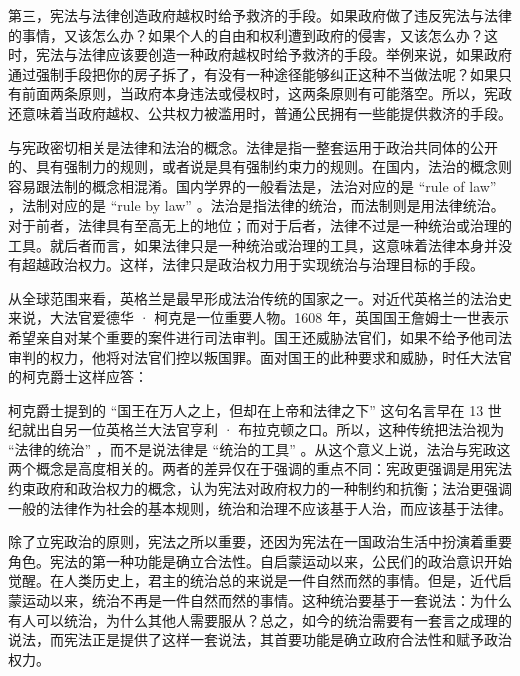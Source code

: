 第三，宪法与法律创造政府越权时给予救济的手段。如果政府做了违反宪法与法律的事情，又该怎么办？如果个人的自由和权利遭到政府的侵害，又该怎么办？这时，宪法与法律应该要创造一种政府越权时给予救济的手段。举例来说，如果政府通过强制手段把你的房子拆了，有没有一种途径能够纠正这种不当做法呢？如果只有前面两条原则，当政府本身违法或侵权时，这两条原则有可能落空。所以，宪政还意味着当政府越权、公共权力被滥用时，普通公民拥有一些能提供救济的手段。

与宪政密切相关是法律和法治的概念。法律是指一整套运用于政治共同体的公开的、具有强制力的规则，或者说是具有强制约束力的规则。在国内，法治的概念则容易跟法制的概念相混淆。国内学界的一般看法是，法治对应的是 “rule of law” ，法制对应的是 “rule by law” 。法治是指法律的统治，而法制则是用法律统治。对于前者，法律具有至高无上的地位；而对于后者，法律不过是一种统治或治理的工具。就后者而言，如果法律只是一种统治或治理的工具，这意味着法律本身并没有超越政治权力。这样，法律只是政治权力用于实现统治与治理目标的手段。

从全球范围来看，英格兰是最早形成法治传统的国家之一。对近代英格兰的法治史来说，大法官爱德华 · 柯克是一位重要人物。1608 年，英国国王詹姆士一世表示希望亲自对某个重要的案件进行司法审判。国王还威胁法官们，如果不给予他司法审判的权力，他将对法官们控以叛国罪。面对国王的此种要求和威胁，时任大法官的柯克爵士这样应答：


柯克爵士提到的 “国王在万人之上，但却在上帝和法律之下” 这句名言早在 13 世纪就出自另一位英格兰大法官亨利 · 布拉克顿之口。所以，这种传统把法治视为 “法律的统治” ，而不是说法律是 “统治的工具” 。从这个意义上说，法治与宪政这两个概念是高度相关的。两者的差异仅在于强调的重点不同：宪政更强调是用宪法约束政府和政治权力的概念，认为宪法对政府权力的一种制约和抗衡；法治更强调一般的法律作为社会的基本规则，统治和治理不应该基于人治，而应该基于法律。

除了立宪政治的原则，宪法之所以重要，还因为宪法在一国政治生活中扮演着重要角色。宪法的第一种功能是确立合法性。自启蒙运动以来，公民们的政治意识开始觉醒。在人类历史上，君主的统治总的来说是一件自然而然的事情。但是，近代启蒙运动以来，统治不再是一件自然而然的事情。这种统治要基于一套说法：为什么有人可以统治，为什么其他人需要服从？总之，如今的统治需要有一套言之成理的说法，而宪法正是提供了这样一套说法，其首要功能是确立政府合法性和赋予政治权力。

